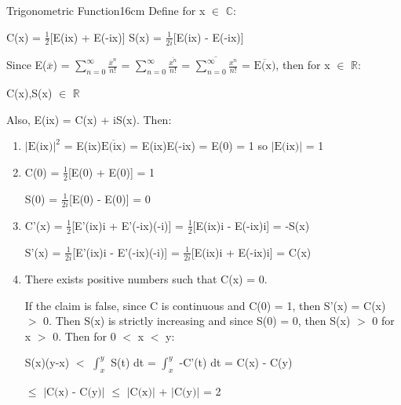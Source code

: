     \begin{definition}{Trigonometric Function}{16cm}
        Define for x $\in$ $\mathbb{C}$:
        
        \hspace{0.5cm}
        C(x) = $\frac{1}{2}$[E(ix) + E(-ix)]
        \hspace{1cm}
        S(x) = $\frac{1}{2i}$[E(ix) - E(-ix)]

        Since E($\overline{x}$) = $\sum_{n=0}^{\infty} \frac{\overline{x}^n}{n!}$
        = $\sum_{n=0}^{\infty} \frac{\overline{x^n}}{n!}$
        = $\overline{\sum_{n=0}^{\infty} \frac{x^n}{n!}}$
        = $\overline{\text{E(x)}}$, then for x $\in$ $\mathbb{R}$:

        \hspace{0.5cm}
        C(x),S(x) $\in$ $\mathbb{R}$

        Also, E(ix) = C(x) + iS(x). Then:

        \begin{enumerate}[label=(\alph*), leftmargin=1.5cm, itemsep=0.1cm]
            \item $|\text{E(ix)}|^2$ = E(ix)$\overline{\text{E(ix)}}$
                = E(ix)E(-ix) = E(0) = 1 so $|\text{E(ix)}|$ = 1

            \item C(0) = $\frac{1}{2}$[E(0) + E(0)] = 1
            
                S(0) = $\frac{1}{2i}$[E(0) - E(0)] = 0

            \item C'(x) = $\frac{1}{2}$[E'(ix)i + E'(-ix)(-i)]
                = $\frac{1}{2}$[E(ix)i - E(-ix)i] = -S(x)

                S'(x) = $\frac{1}{2i}$[E'(ix)i - E'(-ix)(-i)]
                = $\frac{1}{2i}$[E(ix)i + E(-ix)i] = C(x)

            \item There exists positive numbers such that C(x) = 0.
            
                If the claim is false, since C is continuous and C(0) = 1,
                then S'(x) = C(x) $>$ 0. Then S(x) is strictly increasing and
                since S(0) = 0, then S(x) $>$ 0 for x $>$ 0.
                Then for 0 $<$ x $<$ y:

                \hspace{0.5cm}
                S(x)(y-x) $<$ $\int_x^y$ S(t) dt
                = $\int_x^y$ -C'(t) dt
                = C(x) - C(y)

                \hspace{2.3cm}
                $\leq$ $|\text{C(x) - C(y)}|$
                $\leq$ $|\text{C(x)}|$ + $|\text{C(y)}|$ = 2


\end{enumerate}
\end{definition}
